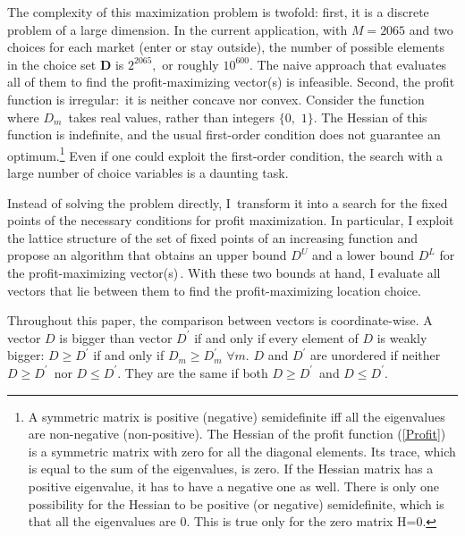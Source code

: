 \documentclass[notitlepage,onecolumn,11pt]{article}
\begin{document}
The complexity of this maximization problem is twofold: first, it is a
discrete problem of a large dimension. In the current application, with $%
M=2065$ and two choices for each market (enter or stay outside), the number
of possible elements in the choice set $\mathbf{D}$ is $2^{2065},$ or
roughly $10^{600}.$ The naive approach that evaluates all of them to find
the profit-maximizing vector(s) is infeasible. Second, the profit function
is irregular:\ it is neither concave nor convex. Consider the function where 
$D_{m}$\ takes real values, rather than integers $\{0,$ $1\}$. The Hessian
of this function is indefinite, and the usual first-order condition does not
guarantee an optimum.\footnote{%
A symmetric matrix is positive (negative) semidefinite iff all the
eigenvalues are non-negative (non-positive). The Hessian of the profit
function (\ref{Profit}) is a symmetric matrix with zero for all the diagonal
elements. Its trace, which is equal to the sum of the eigenvalues, is zero.
If the Hessian matrix has a positive eigenvalue, it has to have a negative
one as well. There is only one possibility for the Hessian to be positive
(or negative) semidefinite, which is that all the eigenvalues are 0. This is
true only for the zero matrix H=0.} Even if one could exploit the
first-order condition, the search with a large number of choice variables is
a daunting task.

Instead of solving the problem directly, I\ transform it into a search for
the fixed points of the necessary conditions for profit maximization. In
particular, I exploit the lattice structure of the set of fixed points of an
increasing function and propose an algorithm that obtains an upper bound $%
D^{U}$ and a lower bound $D^{L}$ for the profit-maximizing vector(s)$\,$.
With these two bounds at hand, I evaluate all vectors that lie between them
to find the profit-maximizing location choice.

Throughout this paper, the comparison between vectors is coordinate-wise. A
vector $D$ is bigger than vector $D^{\prime }$ if and only if every element
of $D$ is weakly bigger: $D\geq D^{\prime }$ if and only if $D_{m}\geq
D_{m}^{\prime }$ $\forall m.$ $D$ and $D^{\prime }$ are unordered if neither 
$D\geq D^{\prime }$\ nor $D\leq D^{\prime }.$ They are the same if both $%
D\geq D^{\prime }$\ and $D\leq D^{\prime }.$
\end{document}
